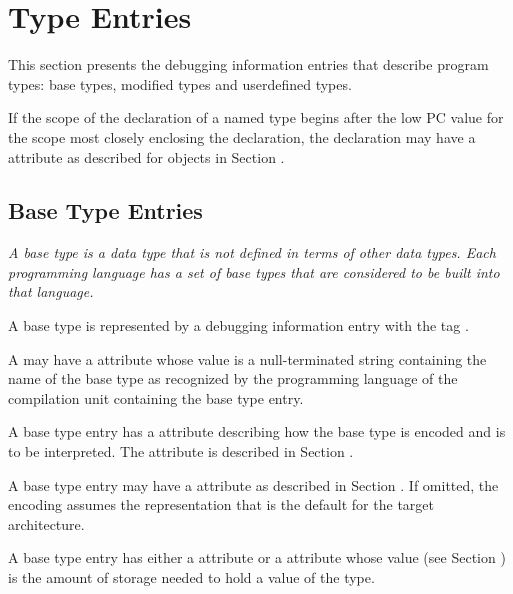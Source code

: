 \chapter{Type Entries}
\label{chap:typeentries}
This section presents the debugging information entries
that describe program types: base types, modified types and
user\dash defined types.

If the scope of the declaration of a named type begins after
\hypertarget{chap:DWATstartscopetypedeclaration}{}
the low PC value for the scope most closely enclosing the
declaration, the declaration may have a 
\DWATstartscopeDEFN{}
attribute as described for objects in 
Section .

\section{Base Type Entries}
\label{chap:basetypeentries}

\textit{A base type is a data type that is not defined in terms of
other data types. 
Each programming language has a set of base
types that are considered to be built into that language.}

A base type is represented by a debugging information entry
with the tag \DWTAGbasetypeTARG.

A 
may have a \DWATname{} attribute
whose value is
a null-terminated string containing the name of the base type
as recognized by the programming language of the compilation
unit containing the base type entry.

A base type entry has 
a \DWATencoding{} attribute describing
how the base type is encoded and is to be interpreted. 
The \DWATencoding{} attribute is described in
Section .

A base type entry
may have a \DWATendianity{} attribute
as described in 
Section . 
If omitted, the encoding assumes the representation that
is the default for the target architecture.

A base type entry has 
\hypertarget{chap:DWATbytesizedataobjectordatatypesize}{}
either a \DWATbytesize{} attribute
\hypertarget{chap:DWATbitsizebasetypebitsize}{}
or a \DWATbitsize{} attribute 
whose  value
(see Section ) 
is the amount of storage needed to hold
a value of the type.

